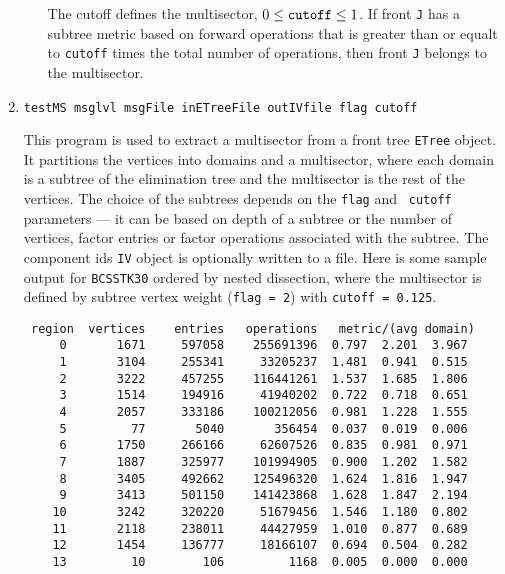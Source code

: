 \begin{enumerate}
\begin{itemize}
The cutoff defines the multisector, $0 \le \mbox{\tt cutoff} \le 1$.
If front {\tt J} has a subtree metric based on forward operations
that is greater than or equalt to {\tt cutoff} times the total
number of operations, then front {\tt J} belongs to the
multisector.
\end{itemize}
\item
\begin{verbatim}
testMS msglvl msgFile inETreeFile outIVfile flag cutoff
\end{verbatim}
This program is used to extract a multisector from a front tree
{\tt ETree} object.
It partitions the vertices into domains and a multisector, where
each domain is a subtree of the elimination tree and the
multisector is the rest of the vertices.
The choice of the subtrees depends on the {\tt flag} and {\tt
cutoff} parameters --- it can be based on depth of a subtree or the
number of vertices, factor entries or factor operations associated
with the subtree.
The component ids {\tt IV} object is optionally written to a file.
Here is some sample output for {\tt BCSSTK30} ordered by nested
dissection, where the multisector is defined by subtree vertex
weight ({\tt flag = 2}) with {\tt cutoff = 0.125}.
\begin{verbatim}
 region  vertices    entries   operations   metric/(avg domain)
     0       1671     597058    255691396  0.797  2.201  3.967
     1       3104     255341     33205237  1.481  0.941  0.515
     2       3222     457255    116441261  1.537  1.685  1.806
     3       1514     194916     41940202  0.722  0.718  0.651
     4       2057     333186    100212056  0.981  1.228  1.555
     5         77       5040       356454  0.037  0.019  0.006
     6       1750     266166     62607526  0.835  0.981  0.971
     7       1887     325977    101994905  0.900  1.202  1.582
     8       3405     492662    125496320  1.624  1.816  1.947
     9       3413     501150    141423868  1.628  1.847  2.194
    10       3242     320220     51679456  1.546  1.180  0.802
    11       2118     238011     44427959  1.010  0.877  0.689
    12       1454     136777     18166107  0.694  0.504  0.282
    13         10        106         1168  0.005  0.000  0.000
 

\end{verbatim}
\end{enumerate}

